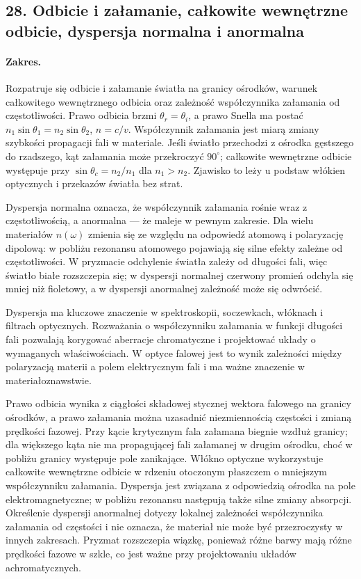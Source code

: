 \documentclass[11pt,a4paper]{article}
\begin{document}
\subsection{28. Odbicie i załamanie, całkowite wewnętrzne odbicie, dyspersja normalna i anormalna}
\paragraph{Zakres.} Rozpatruje się odbicie i załamanie światła na granicy ośrodków, warunek całkowitego wewnętrznego odbicia oraz zależność współczynnika załamania od częstotliwości. Prawo odbicia brzmi $\theta_r=\theta_i$, a prawo Snella ma postać $n_1\sin\theta_1=n_2\sin\theta_2$, $n=c/v$. Współczynnik załamania jest miarą zmiany szybkości propagacji fali w materiale. Jeśli światło przechodzi z ośrodka gęstszego do rzadszego, kąt załamania może przekroczyć $90^\circ$; całkowite wewnętrzne odbicie występuje przy $\sin\theta_c=n_2/n_1$ dla $n_1>n_2$. Zjawisko to leży u podstaw włókien optycznych i przekazów światła bez strat.\par
Dyspersja normalna oznacza, że współczynnik załamania rośnie wraz z częstotliwością, a anormalna — że maleje w pewnym zakresie. Dla wielu materiałów $n(\omega)$ zmienia się ze względu na odpowiedź atomową i polaryzację dipolową: w pobliżu rezonansu atomowego pojawiają się silne efekty zależne od częstotliwości. W pryzmacie odchylenie światła zależy od długości fali, więc światło białe rozszczepia się; w dyspersji normalnej czerwony promień odchyla się mniej niż fioletowy, a w dyspersji anormalnej zależność może się odwrócić.\par
Dyspersja ma kluczowe znaczenie w spektroskopii, soczewkach, włóknach i filtrach optycznych. Rozważania o współczynniku załamania w funkcji długości fali pozwalają korygować aberracje chromatyczne i projektować układy o wymaganych właściwościach. W optyce falowej jest to wynik zależności między polaryzacją materii a polem elektrycznym fali i ma ważne znaczenie w materiałoznawstwie.\par

Prawo odbicia wynika z ciągłości składowej stycznej wektora falowego na granicy ośrodków, a prawo załamania można uzasadnić niezmiennością częstości i zmianą prędkości fazowej. Przy kącie krytycznym fala załamana biegnie wzdłuż granicy; dla większego kąta nie ma propagującej fali załamanej w drugim ośrodku, choć w pobliżu granicy występuje pole zanikające. Włókno optyczne wykorzystuje całkowite wewnętrzne odbicie w rdzeniu otoczonym płaszczem o mniejszym współczynniku załamania. Dyspersja jest związana z odpowiedzią ośrodka na pole elektromagnetyczne; w pobliżu rezonansu następują także silne zmiany absorpcji. Określenie dyspersji anormalnej dotyczy lokalnej zależności współczynnika załamania od częstości i nie oznacza, że materiał nie może być przezroczysty w innych zakresach. Pryzmat rozszczepia wiązkę, ponieważ różne barwy mają różne prędkości fazowe w szkle, co jest ważne przy projektowaniu układów achromatycznych.
\par
\end{document}
